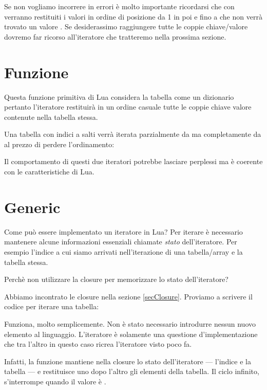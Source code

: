 Se non vogliamo incorrere in errori è molto importante ricordarsi che con
 verranno restituiti i valori in ordine di posizione da 1 in poi e
fino a che non verrà trovato un valore . Se desiderassimo raggiungere
tutte le coppie chiave/valore dovremo far ricorso all'iteratore 
che tratteremo nella prossima sezione.


\section{Funzione }
\label{secFondPairsIterator}

Questa funzione primitiva di Lua considera la tabella come un dizionario
pertanto l'iteratore restituirà in un ordine casuale tutte le coppie chiave
valore contenute nella tabella stessa.

Una tabella con indici a salti verrà iterata parzialmente da  ma
completamente da  al prezzo di perdere l'ordinamento:

Il comportamento di questi due iteratori potrebbe lasciare perplessi ma è
coerente con le caratteristiche di Lua.


\section{Generic }

Come può essere implementato un iteratore in Lua? Per iterare è necessario
mantenere alcune informazioni essenziali chiamate \emph{stato} dell'iteratore.
Per esempio l'indice a cui siamo arrivati nell'iterazione di una tabella/array
e la tabella stessa.

Perchè non utilizzare la closure per memorizzare lo stato dell'iteratore?

Abbiamo incontrato le closure nella sezione \ref{secClosure}. Proviamo a
scrivere il codice per iterare una tabella:

Funziona, molto semplicemente. Non è stato necessario introdurre nessun nuovo
elemento al linguaggio. L'iteratore è solamente una questione d'implementazione
che tra l'altro in questo caso ricrea l'iteratore  visto poco fa.

Infatti, la funzione  mantiene nella closure lo stato
dell'iteratore --- l'indice  e la tabella  --- e restituisce uno
dopo l'altro gli elementi della tabella. Il ciclo  infinito,
s'interrompe quando il valore è .

